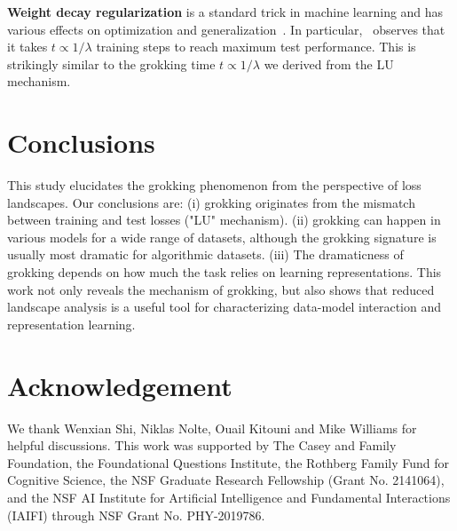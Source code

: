 \documentclass{article} %
\begin{document}
{\bf Weight decay regularization} is a standard trick in machine learning and has various effects on optimization and generalization~\citep{zhang2018three,van2017l2}. In particular,~\citep{lewkowycz2020training} observes that it takes $t\propto 1/\lambda$ training steps to reach maximum test performance. This is strikingly similar to the grokking time $t\propto 1/\lambda$ we derived from the LU mechanism.


\section{Conclusions}\label{sec:conclusions}

This study elucidates the grokking phenomenon from the perspective of loss landscapes. Our conclusions are: (i) grokking originates from the mismatch between training and test losses ("LU" mechanism). (ii) grokking can happen in various models for a wide range of datasets, although the grokking signature is usually most dramatic for algorithmic datasets. (iii) The dramaticness of grokking depends on how much the task relies on learning representations. This work not only reveals the mechanism of grokking, but also shows that reduced landscape analysis is a useful tool for characterizing data-model interaction and representation learning.


\section*{Acknowledgement}
We thank Wenxian Shi, Niklas Nolte, Ouail Kitouni and Mike Williams for helpful discussions. This work was supported by The Casey and Family Foundation, the Foundational Questions
Institute, the Rothberg Family Fund for Cognitive Science, the NSF Graduate Research Fellowship (Grant No. 2141064), and the NSF AI Institute for Artificial Intelligence and Fundamental Interactions (IAIFI) through NSF Grant No. PHY-2019786.


\end{document}
